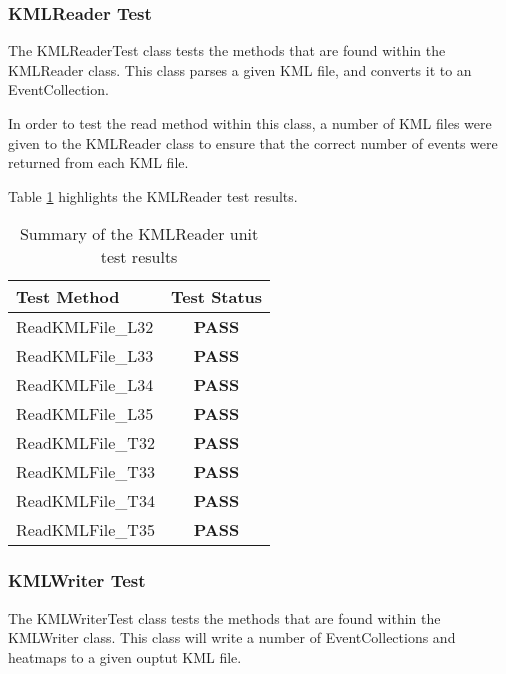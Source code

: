 \subsubsection{KMLReader Test}

The {\ttfamily KMLReaderTest} class tests the methods that are found within the
KMLReader class. This class parses a given KML file, and converts it to an
EventCollection.

In order to test the read method within this class, a number of KML files were 
given to the {\ttfamily KMLReader} class to ensure that the correct number of 
events were returned from each KML file.

Table \ref{tab:kml_reader_test} highlights the KMLReader test results.

\begin{table}[h]
  \centering
  \begin{tabular}{|l|c|}
    \hline
    {\bfseries Test Method} & {\bfseries Test Status} \\ 
    \hline
    ReadKMLFile\_L32        & {\bfseries \color{OliveGreen} PASS}   \\ 
    ReadKMLFile\_L33        & {\bfseries \color{OliveGreen} PASS}   \\ 
    ReadKMLFile\_L34        & {\bfseries \color{OliveGreen} PASS}   \\ 
    ReadKMLFile\_L35        & {\bfseries \color{OliveGreen} PASS}   \\ 
    ReadKMLFile\_T32        & {\bfseries \color{OliveGreen} PASS}   \\ 
    ReadKMLFile\_T33        & {\bfseries \color{OliveGreen} PASS}   \\ 
    ReadKMLFile\_T34        & {\bfseries \color{OliveGreen} PASS}   \\ 
    ReadKMLFile\_T35        & {\bfseries \color{OliveGreen} PASS}   \\
    \hline
  \end{tabular}
  \caption[Summary of the KMLReader unit test results]
          {Summary of the KMLReader unit test results}
  \label{tab:kml_reader_test}
\end{table}


\subsubsection{KMLWriter Test}

The {\ttfamily KMLWriterTest} class tests the methods that are found within the
KMLWriter class. This class will write a number of EventCollections and 
heatmaps to a given ouptut KML file.

